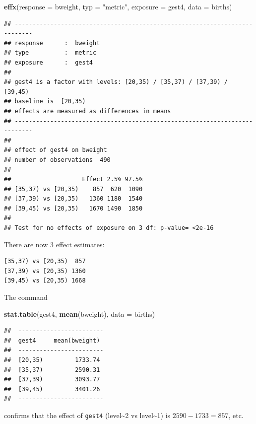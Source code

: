 \documentclass[
]{book}
\newenvironment{Shaded}{\begin{snugshade}}{\end{snugshade}}
\newcommand{\AttributeTok}[1]{\textcolor[rgb]{0.13,0.29,0.53}{#1}}
\newcommand{\FunctionTok}[1]{\textcolor[rgb]{0.13,0.29,0.53}{\textbf{#1}}}
\newcommand{\NormalTok}[1]{#1}
\newcommand{\StringTok}[1]{\textcolor[rgb]{0.31,0.60,0.02}{#1}}
\begin{document}
\begin{Shaded}
\begin{Highlighting}[]
\FunctionTok{effx}\NormalTok{(}\AttributeTok{response =}\NormalTok{ bweight, }\AttributeTok{typ =} \StringTok{"metric"}\NormalTok{, }\AttributeTok{exposure =}\NormalTok{ gest4, }\AttributeTok{data =}\NormalTok{ births)}
\end{Highlighting}
\end{Shaded}

\begin{verbatim}
## --------------------------------------------------------------------------- 
## response      :  bweight 
## type          :  metric 
## exposure      :  gest4 
## 
## gest4 is a factor with levels: [20,35) / [35,37) / [37,39) / [39,45) 
## baseline is  [20,35) 
## effects are measured as differences in means 
## --------------------------------------------------------------------------- 
## 
## effect of gest4 on bweight 
## number of observations  490 
## 
##                    Effect 2.5% 97.5%
## [35,37) vs [20,35)    857  620  1090
## [37,39) vs [20,35)   1360 1180  1540
## [39,45) vs [20,35)   1670 1490  1850
## 
## Test for no effects of exposure on 3 df: p-value= <2e-16
\end{verbatim}

There are now 3 effect estimates:

\begin{verbatim}
[35,37) vs [20,35)  857
[37,39) vs [20,35) 1360
[39,45) vs [20,35) 1668
\end{verbatim}

The command

\begin{Shaded}
\begin{Highlighting}[]
\FunctionTok{stat.table}\NormalTok{(gest4, }\FunctionTok{mean}\NormalTok{(bweight), }\AttributeTok{data =}\NormalTok{ births)}
\end{Highlighting}
\end{Shaded}

\begin{verbatim}
##  ------------------------ 
##  gest4     mean(bweight)  
##  ------------------------ 
##  [20,35)         1733.74  
##  [35,37)         2590.31  
##  [37,39)         3093.77  
##  [39,45)         3401.26  
##  ------------------------
\end{verbatim}

confirms that the effect of \texttt{gest4} (level\textasciitilde2 vs level\textasciitilde1) is \(2590-1733=857\), etc.
\end{document}
